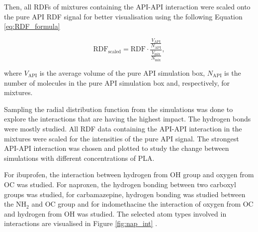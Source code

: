 Then, all RDFs of mixtures containing the API-API interaction were scaled onto the pure API RDF signal for better visualisation using the following Equation \ref{eq:RDF_formula}

\begin{equation}\label{eq:RDF_formula}
	\text{RDF}_{\text{scaled}} = \text{RDF} \cdot \frac{\displaystyle\frac{V_{\text{API}}}{N_{\text{API}}}}{\displaystyle{\frac{V_{\text{mix}}}{N_{\text{mix}}}}},
\end{equation}

where $V_{\text{API}}$ is the average volume of the pure API simulation box, $N_{\text{API}}$ is the number of molecules in the pure API simulation box and, respectively, for mixtures.

Sampling the radial distribution function from the simulations was done to explore the interactions that are having the highest impact. The hydrogen bonds were mostly studied. All RDF data containing the API-API interaction in the mixtures were scaled for the intensities of the pure API signal. The strongest API-API interaction was chosen and plotted to study the change between simulations with different concentrations of PLA. 

For ibuprofen, the interaction between hydrogen from OH group and oxygen from OC was studied. For naproxen, the hydrogen bonding between two carboxyl groups was studied, for carbamazepine, hydrogen bonding was studied between the N$\text{H}_\text{2}$ and OC group and for indomethacine the interaction of oxygen from OC and hydrogen from OH was studied.  The selected atom types involved in interactions are visualised in Figure \ref{fig:nap_int} . 



